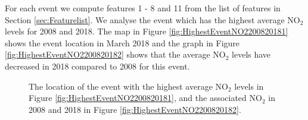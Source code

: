 \documentclass[a4paper,11pt]{article}
\begin{document}
For each event we compute features 1 - 8 and 11 from the list of features in Section \ref{sec:Featurelist}. We analyse the event which has the highest average $\text{NO}_2$ levels for 2008 and 2018. The map in Figure \ref{fig:HighestEventNO2200820181} shows the event location in March 2018 and the graph in Figure \ref{fig:HighestEventNO2200820182} shows that the average $\text{NO}_2$ levels have decreased in 2018 compared to 2008 for this event.

\begin{figure}[H]
	\centering
	\caption{\footnotesize The location of the event with the highest average $\text{NO}_2$ levels in Figure \ref{fig:HighestEventNO2200820181}, and the associated $\text{NO}_2$ in 2008 and 2018 in Figure \ref{fig:HighestEventNO2200820182}. }
	\label{fig:HighestEventNO220082018}
\end{figure}
\end{document}

